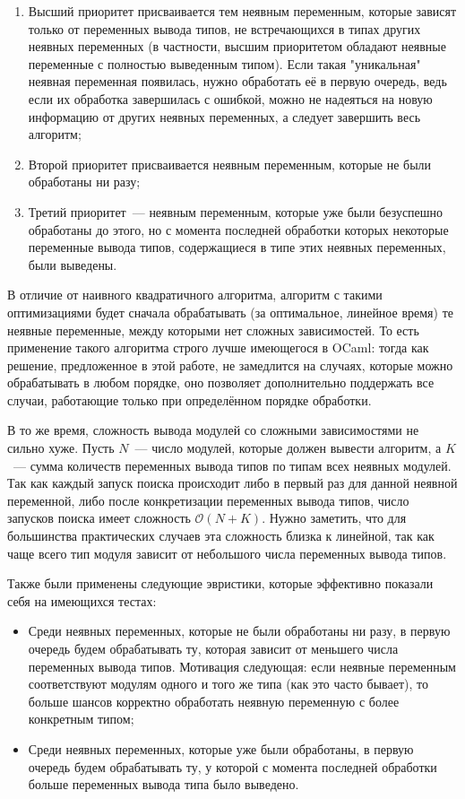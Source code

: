 \documentclass[../diploma.tex]{subfiles}
\begin{document}
\begin{enumerate}
\item Высший приоритет присваивается тем неявным переменным, которые зависят только от переменных вывода типов, не встречающихся в типах других неявных переменных (в частности, высшим приоритетом обладают неявные переменные с полностью выведенным типом). Если такая "уникальная" неявная переменная появилась, нужно обработать её в первую очередь, ведь если их обработка завершилась с ошибкой, можно не надеяться на новую информацию от других неявных переменных, а следует завершить весь алгоритм;

\item Второй приоритет присваивается неявным переменным, которые не были обработаны ни разу;

\item Третий приоритет~--- неявным переменным, которые уже были безуспешно обработаны до этого, но с момента последней обработки которых некоторые переменные вывода типов, содержащиеся в типе этих неявных переменных, были выведены.
\end{enumerate}

В отличие от наивного квадратичного алгоритма, алгоритм с такими оптимизациями будет сначала обрабатывать (за оптимальное, линейное время) те неявные переменные, между которыми нет сложных зависимостей. То есть применение такого алгоритма строго лучше имеющегося в OCaml: тогда как решение, предложенное в этой работе, не замедлится на случаях, которые можно обрабатывать в любом порядке, оно позволяет дополнительно поддержать все случаи, работающие только при определённом порядке обработки.

В то же время, сложность вывода модулей со сложными зависимостями не сильно хуже. Пусть $N$~--- число модулей, которые должен вывести алгоритм, а $K$~--- сумма количеств переменных вывода типов по типам всех неявных модулей. Так как каждый запуск поиска происходит либо в первый раз для данной неявной переменной, либо после конкретизации переменных вывода типов, число запусков поиска имеет сложность $\mathcal{O}(N + K)$. Нужно заметить, что для большинства практических случаев эта сложность близка к линейной, так как чаще всего тип модуля зависит от небольшого числа переменных вывода типов.

Также были применены следующие эвристики, которые эффективно показали себя на имеющихся тестах:
\begin{itemize}
  \item Среди неявных переменных, которые не были обработаны ни разу, в первую очередь будем обрабатывать ту, которая зависит от меньшего числа переменных вывода типов. Мотивация следующая: если неявные переменным соответствуют модулям одного и того же типа (как это часто бывает), то больше шансов корректно обработать неявную переменную с более конкретным типом;
  \item Среди неявных переменных, которые уже были обработаны, в первую очередь будем обрабатывать ту, у которой с момента последней обработки больше переменных вывода типа было выведено.
\end{itemize}
\end{document}
